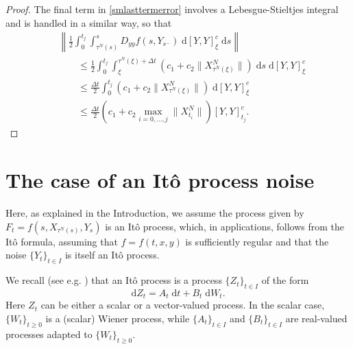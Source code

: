 \documentclass[reqno,12pt]{amsart}
\theoremstyle{plain} %
\theoremstyle{definition} %
\begin{document}
\begin{proof}
    The final term in \eqref{smlasttermerror} involves a Lebesgue-Stieltjes integral and is handled in a similar way, so that
    \begin{align*}
        & \left\|\frac{1}{2} \int_0^{t_j} \int_{\tau^N(s)}^s D_{yy}f(s, Y_{s^-})\;\mathrm{d}[Y, Y]_\xi^c\;\mathrm{d}s\right\| \\
        & \qquad \leq \frac{1}{2} \int_0^{t_j} \int_{\xi}^{\tau^N(\xi) + \Delta t} \left(c_1 + c_2 \|X_{\tau^N(\xi)}^N\|\right)\;\mathrm{d}s\;\mathrm{d}[Y, Y]_\xi^c \\
        & \qquad \leq \frac{\Delta t}{2}\int_0^{t_j} \left(c_1 + c_2 \|X_{\tau^N(\xi)}^N\|\right)\;\mathrm{d}[Y, Y]_\xi^c \\ 
        & \qquad \leq \frac{\Delta t}{2} \left(c_1 + c_2 \max_{i=0, \ldots, j}\|X_{t_i}^N\|\right) [Y, Y]_{t_j}^c.
    \end{align*}
\end{proof}

\section{The case of an It\^o process noise}

Here, as explained in the Introduction, we assume the process given by $F_t = f(s, X_{\tau^N(s)}, Y_s)$ is an It\^o process, which, in applications, follows from the It\^o formula, assuming that $f=f(t, x, y)$ is sufficiently regular and that the noise $\{Y_t\}_{t\in I}$ is itself an It\^o process.

We recall (see e.g. \cite[Chapter 4]{Oksendal2003}) that an It\^o process is a process $\{Z_t\}_{t\in I}$ of the form
\begin{equation}
    \label{Itoprocess}
    \mathrm{d}Z_t = A_t\;\mathrm{d}t + B_t\;\mathrm{d}W_t.
\end{equation}
Here $Z_t$ can be either a scalar or a vector-valued process. In the scalar case, $\{W_t\}_{t\geq 0}$ is a (scalar) Wiener process, while $\{A_t\}_{t\in I}$ and $\{B_t\}_{t\in I}$ are real-valued processes adapted to $\{W_t\}_{t\geq 0}$.
\end{document}
